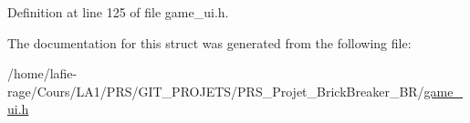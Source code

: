 Definition at line 125 of file game\+\_\+ui.\+h.



The documentation for this struct was generated from the following file\+:\begin{DoxyCompactItemize}
\item 
/home/lafie-\/rage/\+Cours/\+L\+A1/\+P\+R\+S/\+G\+I\+T\+\_\+\+P\+R\+O\+J\+E\+T\+S/\+P\+R\+S\+\_\+\+Projet\+\_\+\+Brick\+Breaker\+\_\+\+B\+R/\hyperlink{game__ui_8h}{game\+\_\+ui.\+h}\end{DoxyCompactItemize}
